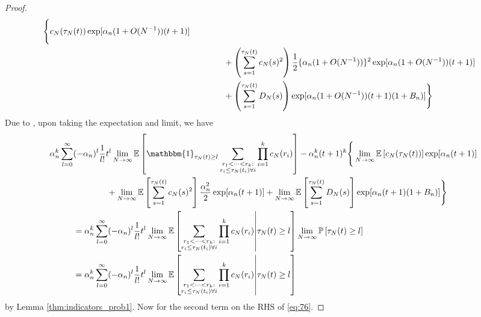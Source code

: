 \documentclass{article}
\newcommand{\Prob}{\mathbb{P}}
\newcommand{\E}{\mathbb{E}}
\newcommand{\1}[1]{\mathbbm{1}_{#1}}
\begin{document}
\begin{proof}
\begin{align}
\Bigg\{ c_N(\tau_N(t)) \exp[ \alpha_n (1 + O(N^{-1}) ) (t+1) ] \notag\\
 &\qquad\qquad+  \left( \sum_{s=1}^{\tau_N(t)} c_N(s)^2 \right)
\frac{1}{2} \{ \alpha_n (1 + O(N^{-1}) ) \}^2 \exp[ \alpha_n (1 + O(N^{-1}) ) (t+1) ] \notag\\
&\qquad\qquad+ \left( \sum_{s=1}^{\tau_N(t)} D_N(s) \right)
\exp[ \alpha_n (1 + O(N^{-1}) ) (t+1) (1 + B_n) ] \Bigg\}
\end{align}
Due to \citet[Equations (3.3)--(3.5)]{brown2021}, upon taking the expectation and limit, we have
\begin{align}
\alpha_n^k \sum_{l=0}^{\infty} &(-\alpha_n)^l \frac{1}{l!} t^l 
\lim_{N\to\infty}\E \left[ \1{\tau_N(t) \geq l}
\sum_{\substack{r_1 <\dots< r_k :\\ r_i \leq \tau_N(t_i) \forall i}} \prod_{i=1}^k c_N(r_i) \right] 
- \alpha_n^k (t+1)^k
\Bigg\{ \lim_{N\to\infty}\E\left[c_N(\tau_N(t)) \right] \exp[ \alpha_n (t+1) ] \notag\\
 &\qquad\qquad+  \lim_{N\to\infty}\E\left[ \sum_{s=1}^{\tau_N(t)} c_N(s)^2 \right]
\frac{\alpha_n^2}{2} \exp[ \alpha_n (t+1) ]
+ \lim_{N\to\infty}\E\left[ \sum_{s=1}^{\tau_N(t)} D_N(s) \right]
\exp[ \alpha_n (t+1) (1 + B_n) ] \Bigg\} \notag\\
&= \alpha_n^k \sum_{l=0}^{\infty} (-\alpha_n)^l \frac{1}{l!} t^l 
\lim_{N\to\infty}\E \left[ \sum_{\substack{r_1 <\dots< r_k :\\ r_i \leq \tau_N(t_i) \forall i}} \prod_{i=1}^k c_N(r_i) \middle| \tau_N(t) \geq l \right] 
\lim_{N\to\infty}\Prob\left[ \tau_N(t) \geq l \right] \notag\\
&= \alpha_n^k \sum_{l=0}^{\infty} (-\alpha_n)^l \frac{1}{l!} t^l 
\lim_{N\to\infty}\E \left[ \sum_{\substack{r_1 <\dots< r_k :\\ r_i \leq \tau_N(t_i) \forall i}} \prod_{i=1}^k c_N(r_i) \middle| \tau_N(t) \geq l \right] \label{eq:78a}
\end{align}
by Lemma \ref{thm:indicators_prob1}.
Now for the second term on the RHS of \eqref{eq:76}.

\end{proof}
\end{document}
